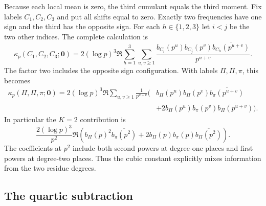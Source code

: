 \documentclass[11pt,reqno]{amsart}
\numberwithin{equation}{section}
\theoremstyle{definition}
\theoremstyle{remark}
\begin{document}
Because each local mean is zero, the third cumulant equals the third
moment.  Fix labels $C_1,C_2,C_3$ and put all shifts equal to zero.
Exactly two frequencies have one sign and the third has the opposite
sign.  For each $h\in\{1,2,3\}$ let $i<j$ be the two other indices.
The complete calculation is
\begin{equation}\label{hi:cubic}
 \kappa_p(C_1,C_2,C_3;\boldsymbol0)
 =2(\log p)^3\Re\sum_{h=1}^3\sum_{u,v\geq1}
 \frac{b_{C_i}(p^u)b_{C_j}(p^v)
       \overline{b_{C_h}(p^{u+v})}}{p^{u+v}}.
\end{equation}
The factor two includes the opposite sign configuration.  With labels
$\Pi,\Pi,\pi$, this becomes
\begin{equation}\label{hi:cubic-mixed}
 \begin{split}
 \kappa_p(\Pi,\Pi,\pi;\boldsymbol0)
 =2(\log p)^3\Re\sum_{u,v\geq1}\frac1{p^{u+v}}
 \bigl(&b_\Pi(p^u)b_\Pi(p^v)\overline{b_\pi(p^{u+v})}\\
 &+2b_\Pi(p^u)b_\pi(p^v)\overline{b_\Pi(p^{u+v})}\bigr).
 \end{split}
\end{equation}
In particular the $K=2$ contribution is
\begin{equation}\label{hi:cubic-first}
 \frac{2(\log p)^3}{p^2}\Re\left(
 b_\Pi(p)^2\overline{b_\pi(p^2)}
 +2b_\Pi(p)b_\pi(p)\overline{b_\Pi(p^2)}\right).
\end{equation}
The coefficients at $p^2$ include both second powers at degree-one places
and first powers at degree-two places.  Thus the cubic constant explicitly
mixes information from the two residue degrees.

\subsection{The quartic subtraction}
\end{document}
